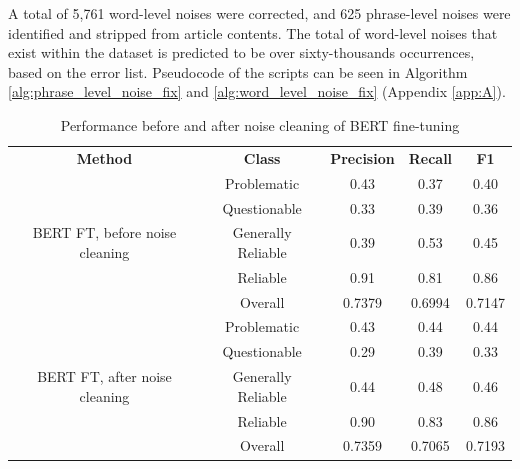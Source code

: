 A total of 5,761 word-level noises were corrected, and 625 phrase-level noises were identified and stripped from article contents. The total of word-level noises that exist within the dataset is predicted to be over sixty-thousands occurrences, based on the error list. Pseudocode of the scripts can be seen in Algorithm \ref{alg:phrase_level_noise_fix} and \ref{alg:word_level_noise_fix} (Appendix \ref{app:A}).


\begin{table}[htbp]
    \centering
    \footnotesize
    \begin{tabular}{| c | c | c | c | c |}
        \hline                            \textbf{Method} & \textbf{Class}     & \textbf{Precision} & \textbf{Recall} & \textbf{F1} \\\cline{1-5}

        \multirow{5}{*}{BERT FT, before noise cleaning}   & Problematic        & 0.43               & 0.37            & 0.40        \\
                                                          & Questionable       & 0.33               & 0.39            & 0.36        \\
                                                          & Generally Reliable & 0.39               & 0.53            & 0.45        \\
                                                          & Reliable           & 0.91               & 0.81            & 0.86        \\\cline{2-5}
                                                          & Overall            & 0.7379             & 0.6994          & 0.7147      \\
        \hline
        \multirow{5}{*}{BERT FT, after noise cleaning}    & Problematic        & 0.43               & 0.44            & 0.44        \\
                                                          & Questionable       & 0.29               & 0.39            & 0.33        \\
                                                          & Generally Reliable & 0.44               & 0.48            & 0.46        \\
                                                          & Reliable           & 0.90               & 0.83            & 0.86        \\\cline{2-5}
                                                          & Overall            & 0.7359             & 0.7065          & 0.7193      \\
        \hline
    \end{tabular}
    \caption{Performance before and after noise cleaning of BERT fine-tuning}
    \label{table:noise_performance_comparison}
\end{table}

